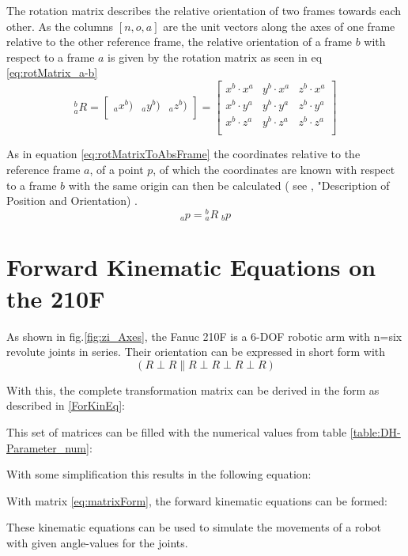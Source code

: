 The rotation matrix describes the relative orientation of two frames towards each other. As the columns $[n,o,a]$ are the unit vectors along the axes of one frame relative to the other reference frame, the relative orientation of a frame ${b}$ with respect to a frame ${a}$ is given by the rotation matrix as seen in eq \ref{eq:rotMatrix_a-b} \cite{ConstantinForwardKA}
\begin{equation}
	\phantom{}^b_aR =
	\begin{bmatrix}
	\phantom{}_ax^b) & \phantom{}_ay^b) & \phantom{}_az^b) \\
	\end{bmatrix}
	=
	\begin{bmatrix}
	x^b \cdot x^a & y^b \cdot x^a & z^b \cdot x^a \\
	x^b \cdot y^a & y^b \cdot y^a & z^b \cdot y^a \\
	x^b \cdot z^a & y^b \cdot z^a & z^b \cdot z^a \\
	\end{bmatrix}
\end{equation}

As in equation \ref{eq:rotMatrixToAbsFrame} the coordinates relative to the reference frame ${a}$, of a point $p$, of which the coordinates are known with respect to a frame ${b}$ with the same origin can then be calculated ( see \cite{RobotKinemDyn}, "Description of Position and Orientation) .
\begin{equation}\label{eq:rotMatrixToAbsFrame}
	\phantom{}_a p = \phantom{}^b_aR\phantom{.}_b p 
\end{equation}




\section{Forward Kinematic Equations on the 210F}
As shown in fig.\ref{fig:zi_Axes}, the Fanuc 210F is a 6-\ac{DOF} robotic arm with n=six revolute joints in series. 
Their orientation can be expressed in short form with 
\begin{equation}
	(R\perp R\parallel R\perp R\perp R\perp R )
\end{equation}

With this, the complete transformation matrix can be derived in the form as described in \ref{ForKinEq}:



This set of matrices can be filled with the numerical values from table \ref{table:DH-Parameter_num}:



With some simplification this results in the following equation:



With matrix \ref{eq:matrixForm}, the forward kinematic equations can be formed:




These kinematic equations can be used to simulate the movements of a robot with given angle-values for the joints. 

